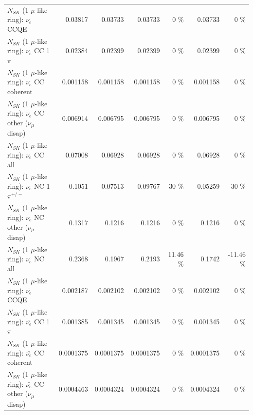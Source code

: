 \begin{table}
\begin{tabular}{| l | r | r | r  r | r  r |}
\hline
\hline
\hline
                                      $N_{SK}$ (1 $\mu$-like ring): $\nu_e$ CCQE &         0.03817 &         0.03733 &         0.03733 &        0 \%  &         0.03733 &        0 \%  \\ 
                                 $N_{SK}$ (1 $\mu$-like ring): $\nu_e$ CC 1$\pi$ &         0.02384 &         0.02399 &         0.02399 &        0 \%  &         0.02399 &        0 \%  \\ 
                               $N_{SK}$ (1 $\mu$-like ring): $\nu_e$ CC coherent &        0.001158 &        0.001158 &        0.001158 &        0 \%  &        0.001158 &        0 \%  \\ 
                $N_{SK}$ (1 $\mu$-like ring): $\nu_e$ CC other ($\nu_\mu$ disap) &        0.006914 &        0.006795 &        0.006795 &        0 \%  &        0.006795 &        0 \%  \\ 
                                  $N_{SK}$ (1 $\mu$-like ring): $\nu_{e}$ CC all &         0.07008 &         0.06928 &         0.06928 &        0 \%  &         0.06928 &        0 \%  \\ 
\hline
                           $N_{SK}$ (1 $\mu$-like ring): $\nu_e$ NC 1$\pi^{+/-}$ &          0.1051 &         0.07513 &         0.09767 &       30 \%  &         0.05259 &      -30 \%  \\ 
                $N_{SK}$ (1 $\mu$-like ring): $\nu_e$ NC other ($\nu_\mu$ disap) &          0.1317 &          0.1216 &          0.1216 &        0 \%  &          0.1216 &        0 \%  \\ 
                                  $N_{SK}$ (1 $\mu$-like ring): $\nu_{e}$ NC all &          0.2368 &          0.1967 &          0.2193 &    11.46 \%  &          0.1742 &   -11.46 \%  \\ 
\hline
\hline
\hline
                                $N_{SK}$ (1 $\mu$-like ring): $\bar{\nu_e}$ CCQE &        0.002187 &        0.002102 &        0.002102 &        0 \%  &        0.002102 &        0 \%  \\ 
                           $N_{SK}$ (1 $\mu$-like ring): $\bar{\nu_e}$ CC 1$\pi$ &        0.001385 &        0.001345 &        0.001345 &        0 \%  &        0.001345 &        0 \%  \\ 
                         $N_{SK}$ (1 $\mu$-like ring): $\bar{\nu_e}$ CC coherent &       0.0001375 &       0.0001375 &       0.0001375 &        0 \%  &       0.0001375 &        0 \%  \\ 
          $N_{SK}$ (1 $\mu$-like ring): $\bar{\nu_e}$ CC other ($\nu_\mu$ disap) &       0.0004463 &       0.0004324 &       0.0004324 &        0 \%  &       0.0004324 &        0 \%  \\ 

\end{tabular}
\end{table}

